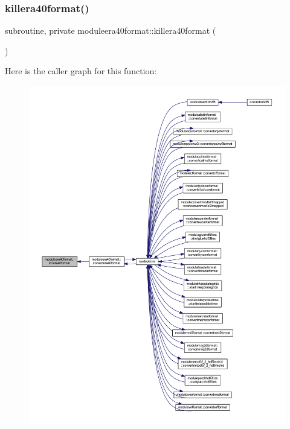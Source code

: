 \subsubsection{\texorpdfstring{killera40format()}{killera40format()}}
{\footnotesize\ttfamily subroutine, private moduleera40format\+::killera40format (\begin{DoxyParamCaption}{ }\end{DoxyParamCaption})\hspace{0.3cm}{\ttfamily [private]}}

Here is the caller graph for this function\+:\nopagebreak
\begin{figure}[H]
\begin{center}
\leavevmode
\includegraphics[width=350pt]{namespacemoduleera40format_aa8632d63af3434480b59776e3b58b294_icgraph}
\end{center}
\end{figure}
\mbox{\label{namespacemoduleera40format_a84aefcd4351fc116d22a21fdfce2ec4f}} 
